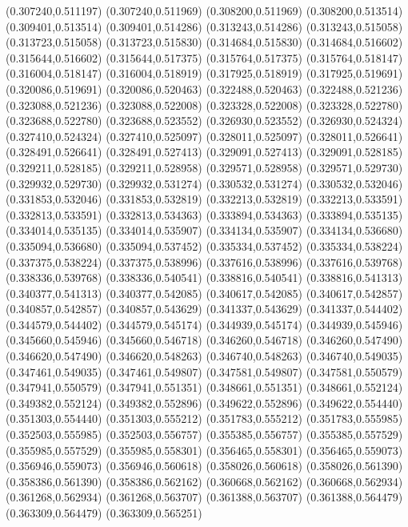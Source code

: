 (0.307240,0.511197)
(0.307240,0.511969)
(0.308200,0.511969)
(0.308200,0.513514)
(0.309401,0.513514)
(0.309401,0.514286)
(0.313243,0.514286)
(0.313243,0.515058)
(0.313723,0.515058)
(0.313723,0.515830)
(0.314684,0.515830)
(0.314684,0.516602)
(0.315644,0.516602)
(0.315644,0.517375)
(0.315764,0.517375)
(0.315764,0.518147)
(0.316004,0.518147)
(0.316004,0.518919)
(0.317925,0.518919)
(0.317925,0.519691)
(0.320086,0.519691)
(0.320086,0.520463)
(0.322488,0.520463)
(0.322488,0.521236)
(0.323088,0.521236)
(0.323088,0.522008)
(0.323328,0.522008)
(0.323328,0.522780)
(0.323688,0.522780)
(0.323688,0.523552)
(0.326930,0.523552)
(0.326930,0.524324)
(0.327410,0.524324)
(0.327410,0.525097)
(0.328011,0.525097)
(0.328011,0.526641)
(0.328491,0.526641)
(0.328491,0.527413)
(0.329091,0.527413)
(0.329091,0.528185)
(0.329211,0.528185)
(0.329211,0.528958)
(0.329571,0.528958)
(0.329571,0.529730)
(0.329932,0.529730)
(0.329932,0.531274)
(0.330532,0.531274)
(0.330532,0.532046)
(0.331853,0.532046)
(0.331853,0.532819)
(0.332213,0.532819)
(0.332213,0.533591)
(0.332813,0.533591)
(0.332813,0.534363)
(0.333894,0.534363)
(0.333894,0.535135)
(0.334014,0.535135)
(0.334014,0.535907)
(0.334134,0.535907)
(0.334134,0.536680)
(0.335094,0.536680)
(0.335094,0.537452)
(0.335334,0.537452)
(0.335334,0.538224)
(0.337375,0.538224)
(0.337375,0.538996)
(0.337616,0.538996)
(0.337616,0.539768)
(0.338336,0.539768)
(0.338336,0.540541)
(0.338816,0.540541)
(0.338816,0.541313)
(0.340377,0.541313)
(0.340377,0.542085)
(0.340617,0.542085)
(0.340617,0.542857)
(0.340857,0.542857)
(0.340857,0.543629)
(0.341337,0.543629)
(0.341337,0.544402)
(0.344579,0.544402)
(0.344579,0.545174)
(0.344939,0.545174)
(0.344939,0.545946)
(0.345660,0.545946)
(0.345660,0.546718)
(0.346260,0.546718)
(0.346260,0.547490)
(0.346620,0.547490)
(0.346620,0.548263)
(0.346740,0.548263)
(0.346740,0.549035)
(0.347461,0.549035)
(0.347461,0.549807)
(0.347581,0.549807)
(0.347581,0.550579)
(0.347941,0.550579)
(0.347941,0.551351)
(0.348661,0.551351)
(0.348661,0.552124)
(0.349382,0.552124)
(0.349382,0.552896)
(0.349622,0.552896)
(0.349622,0.554440)
(0.351303,0.554440)
(0.351303,0.555212)
(0.351783,0.555212)
(0.351783,0.555985)
(0.352503,0.555985)
(0.352503,0.556757)
(0.355385,0.556757)
(0.355385,0.557529)
(0.355985,0.557529)
(0.355985,0.558301)
(0.356465,0.558301)
(0.356465,0.559073)
(0.356946,0.559073)
(0.356946,0.560618)
(0.358026,0.560618)
(0.358026,0.561390)
(0.358386,0.561390)
(0.358386,0.562162)
(0.360668,0.562162)
(0.360668,0.562934)
(0.361268,0.562934)
(0.361268,0.563707)
(0.361388,0.563707)
(0.361388,0.564479)
(0.363309,0.564479)
(0.363309,0.565251)
